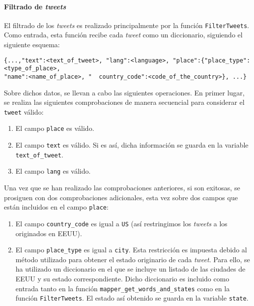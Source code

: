 \documentclass[10pt, spanish]{article}
\begin{document}
\paragraph{Filtrado de \textit{tweets}}

El filtrado de los \textit{tweets} es realizado principalmente por la función \texttt{FilterTweets}. Como entrada, esta función recibe cada \textit{tweet} como un diccionario, siguiendo el siguiente esquema:

\texttt{\{...,"text":<text\_of\_tweet>, "lang":<language>, "place":\{"place\_type":<type\_of\_place>,} \\ \texttt{"name":<name\_of\_place>, "\textcolor{white}{.} \hspace{-5.5mm} country\_code":<code\_of\_the\_country>\}, ...\}}

Sobre dichos datos, se llevan a cabo las siguientes operaciones. En primer lugar, se realiza las siguientes comprobaciones de manera secuencial para considerar el \texttt{tweet} válido:

\begin{enumerate}
\item El campo \texttt{place} es válido.
\item El campo \texttt{text} es válido. Si es así, dicha información se guarda en la variable \texttt{text\_of\_tweet}.
\item El campo \texttt{lang} es válido.
\end{enumerate}

Una vez que se han realizado las comprobaciones anteriores, si son exitosas, se prosiguen con dos comprobaciones adicionales, esta vez sobre dos campos que están incluidos en el campo \texttt{place}:

\begin{enumerate}
\item El campo \texttt{country\_code} es igual a \texttt{US} (así restringimos los \textit{tweets} a los originados en EEUU).
\item El campo \texttt{place\_type} es igual a \texttt{city}. Esta restricción es impuesta debido al método utilizado para obtener el estado originario de cada \textit{tweet}. Para ello, se ha utilizado un diccionario \cite{USCityDic}
en el que se incluye un listado de las ciudades de EEUU y su estado correspondiente. Dicho diccionario es incluido como entrada tanto en la función \texttt{mapper\_get\_words\_and\_states} como en la función \texttt{FilterTweets}. El estado así obtenido se guarda en la variable \texttt{state}.
\end{enumerate}
\end{document}
